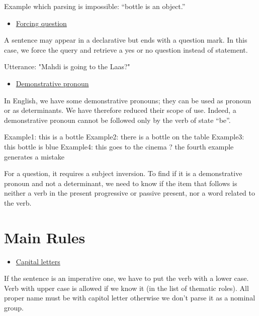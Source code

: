 \documentclass[twoside,a4paper,10pt]{report}
\begin{document}
\small
\begin{verbatimtab}
  Example which parsing is impossible: “bottle is an object.”
\end{verbatimtab}
\normalsize

\begin{itemize}
    \item  \underline{Forcing question}
\end{itemize}
A sentence may appear in a declarative but ends with a question mark. In this case, we force the query and retrieve a yes or no question instead of statement.


\small
\begin{verbatimtab}
  Utterance: "Mahdi is going to the Laas?"
\end{verbatimtab}
\normalsize

\begin{itemize}
    \item  \underline{Demonstrative pronoun}
\end{itemize}
In English, we have some demonstrative pronouns; they can be used as pronoun or as determinants. We have therefore reduced their scope of use. Indeed, a demonstrative pronoun cannot be followed only by the verb of state “be”.


\small
\begin{verbatimtab}
  Example1: this is a bottle
  Example2: there is a bottle on the table
  Example3: this bottle is blue
  Example4: this goes to the cinema 
  ? the fourth example generates a mistake
\end{verbatimtab}
\normalsize
For a question, it requires a subject inversion. To find if it is a demonstrative pronoun and not a determinant, we need to know if the item that follows is neither a verb in the present progressive or passive present, nor a word related to the verb.


\section{Main Rules}
\label{a29295e0e06fd34b31fb0a5367730e7f}%

\begin{itemize}
    \item  \underline{Capital letters}
\end{itemize}
If the sentence is an imperative one, we have to put the verb with a lower case. Verb with upper case is allowed if we know it (in the list of thematic roles). All proper name must be with capitol letter otherwise we don’t parse it as a nominal group.
\end{document}
